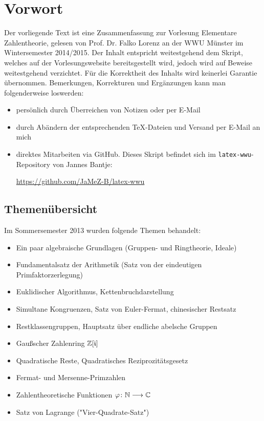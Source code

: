 \section*{Vorwort}
\label{sec:preface}
	Der vorliegende Text ist eine Zusammenfassung zur Vorlesung Elementare Zahlentheorie, gelesen von Prof. Dr. Falko Lorenz an der WWU Münster im Wintersemester 2014/2015. Der Inhalt entspricht weitestgehend dem Skript, welches auf der Vorlesungswebsite bereitsgestellt wird, jedoch wird auf Beweise weitestgehend verzichtet. Für die Korrektheit des Inhalts wird keinerlei Garantie übernommen. Bemerkungen, Korrekturen und Ergänzungen kann man folgenderweise loswerden:
	\begin{itemize}
		\item persönlich durch Überreichen von Notizen oder per E-Mail
		\item durch Abändern der entsprechenden TeX-Dateien und Versand per E-Mail an mich
		\item direktes Mitarbeiten via GitHub. Dieses Skript befindet sich im \texttt{latex-wwu}-Repository von Jannes Bantje:
		\begin{center}
			\url{https://github.com/JaMeZ-B/latex-wwu}
		\end{center}
	\end{itemize}

\subsection*{Themenübersicht}
\label{sub:content}
	Im Sommersemester 2013 wurden folgende Themen behandelt:
	\begin{itemize}
		\item Ein paar algebraische Grundlagen (Gruppen- und Ringtheorie, Ideale) 
		\item Fundamentalsatz der Arithmetik (Satz von der eindeutigen Primfaktorzerlegung) 
		\item Euklidischer Algorithmus, Kettenbruchdarstellung 
		\item Simultane Kongruenzen, Satz von Euler-Fermat, chinesischer Restsatz 
		\item Restklassengruppen, Hauptsatz über endliche abelsche Gruppen 
		\item Gaußscher Zahlenring $\mathbb{Z}[\mathfrak{i}]$ 
		\item Quadratische Reste, Quadratisches Reziprozitätsgesetz 
		\item Fermat- und Mersenne-Primzahlen 
		\item Zahlentheoretische Funktionen $\varphi\colon \mathbb{N} \longrightarrow \mathbb{C}$
		\item Satz von Lagrange ("Vier-Quadrate-Satz")	
	\end{itemize}

